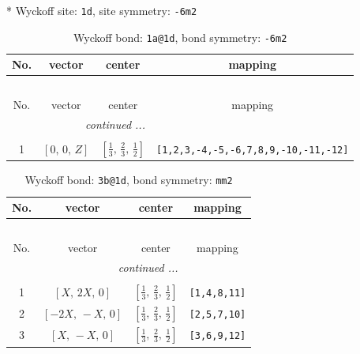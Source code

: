 \documentclass[fleqn,8pt]{jsarticle}
\begin{document}
* Wyckoff site: {\tt 1d}, site symmetry: {\tt -6m2}
\renewcommand{\arraystretch}{1.2}
\begin{longtable}{cccc}
\caption{Wyckoff bond: {\tt 1a@1d}, bond symmetry: {\tt -6m2}}
 \\
 \hline \hline
No. & vector & center & mapping \\ \hline \endfirsthead

\multicolumn{3}{l}{\tablename\ \thetable{}} \\
 \hline \hline
No. & vector & center & mapping \\ \hline \endhead

 \hline \hline
\multicolumn{3}{r}{\footnotesize\it continued ...} \\ \endfoot

 \hline \hline
\multicolumn{3}{r}{} \\ \endlastfoot

1 & $\left[ 0,\, 0,\, Z \right]$ & $\left[ \frac{1}{3},\, \frac{2}{3},\, \frac{1}{2} \right]$ & {\tt [1,2,3,-4,-5,-6,7,8,9,-10,-11,-12]} \\
\end{longtable}
\renewcommand{\arraystretch}{1.2}
\begin{longtable}{cccc}
\caption{Wyckoff bond: {\tt 3b@1d}, bond symmetry: {\tt mm2}}
 \\
 \hline \hline
No. & vector & center & mapping \\ \hline \endfirsthead

\multicolumn{3}{l}{\tablename\ \thetable{}} \\
 \hline \hline
No. & vector & center & mapping \\ \hline \endhead

 \hline \hline
\multicolumn{3}{r}{\footnotesize\it continued ...} \\ \endfoot

 \hline \hline
\multicolumn{3}{r}{} \\ \endlastfoot

1 & $\left[ X,\, 2 X,\, 0 \right]$ & $\left[ \frac{1}{3},\, \frac{2}{3},\, \frac{1}{2} \right]$ & {\tt [1,4,8,11]} \\ \hline
2 & $\left[ - 2 X,\, - X,\, 0 \right]$ & $\left[ \frac{1}{3},\, \frac{2}{3},\, \frac{1}{2} \right]$ & {\tt [2,5,7,10]} \\ \hline
3 & $\left[ X,\, - X,\, 0 \right]$ & $\left[ \frac{1}{3},\, \frac{2}{3},\, \frac{1}{2} \right]$ & {\tt [3,6,9,12]} \\
\end{longtable}
\end{document}
